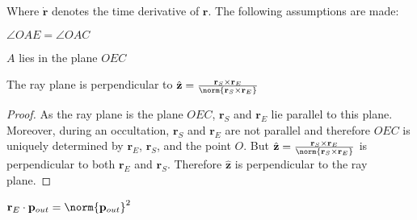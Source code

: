 \documentclass[crop=false,class=book,oneside]{standalone}
\begin{document}
        \vspace{6pt}
        Where $\dot{\mathbf{r}}$ denotes the time derivative
        of $\mathbf{r}$. The following assumptions are made:
        \begin{enumerate}
            \begin{multicols}{2}
                \item $\angle{OAE}=\angle{OAC}$
                \item $A$ lies in the plane $OEC$
            \end{multicols}
        \end{enumerate}
        \begin{theorem}
            \label{theorem:ray_plane_perp_to_r_e_cross_r_s}
            The ray plane is perpendicular to
            $\hat{\mathbf{z}}%
             =\frac{\mathbf{r}_{S}\times
             \mathbf{r}_{E}}{\norm{\mathbf{r}_{S}\times
             \mathbf{r}_{E}}}$
        \end{theorem}
        \begin{proof}
            As the ray plane is the plane $OEC$,
            $\mathbf{r}_{S}$ and $\mathbf{r}_{E}$ lie parallel
            to this plane. Moreover, during an occultation,
            $\mathbf{r}_{S}$ and $\mathbf{r}_{E}$ are not
            parallel and therefore $OEC$ is uniquely determined
            by $\mathbf{r}_{E}$, $\mathbf{r}_{S}$, and the point
            $O$. But
            $\hat{\mathbf{z}}%
             =\frac{\mathbf{r}_{S}\times
             \mathbf{r}_{E}}{\norm{\mathbf{r}_{S}\times
             \mathbf{r}_{E}}}$
            is perpendicular to both $\mathbf{r}_{E}$ and
            $\mathbf{r}_{S}$. Therefore $\hat{\mathbf{z}}$ is
            perpendicular to the ray plane.
        \end{proof}
        \begin{theorem}
            \label{theorem:r_e_dot_p_out_equal_p_out_square}
            $\mathbf{r}_{E}\cdot\mathbf{p}_{out}%
             =\norm{\mathbf{p}_{out}}^{2}$
        \end{theorem}
\end{document}
